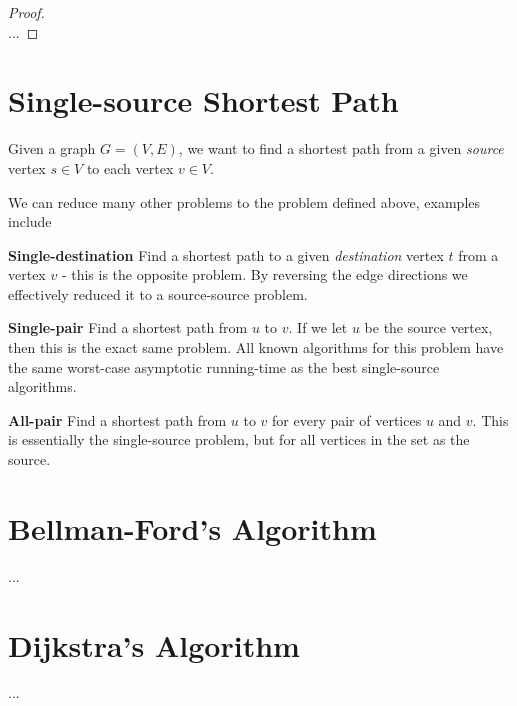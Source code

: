 \begin{proof} \textnormal{\cite[p.~645, thm.~24.1]{clrs}} \\
	...
\end{proof}

\section{Single-source Shortest Path}
Given a graph $G = (V, E)$, we want to find a shortest path from a given
\textit{source} vertex $s \in V$ to each vertex $v \in V$.

We can reduce many other problems to the problem defined above, examples
include
\begin{description}
	\item \textbf{Single-destination} Find a shortest path to a given
\textit{destination} vertex $t$ from a vertex $v$ - this is the opposite
problem. By reversing the edge directions we effectively reduced it to a
source-source problem.
	\item \textbf{Single-pair} Find a shortest path from $u$ to $v$. If we let
$u$ be the source vertex, then this is the exact same problem. All known
algorithms for this problem have the same worst-case asymptotic running-time
as the best single-source algorithms. %
	\item \textbf{All-pair} Find a shortest path from $u$ to $v$ for every
pair of vertices $u$ and $v$. This is essentially the single-source problem,
but for all vertices in the set as the source.
\end{description}

\section{Bellman-Ford's Algorithm}
...

\section{Dijkstra's Algorithm}
...

